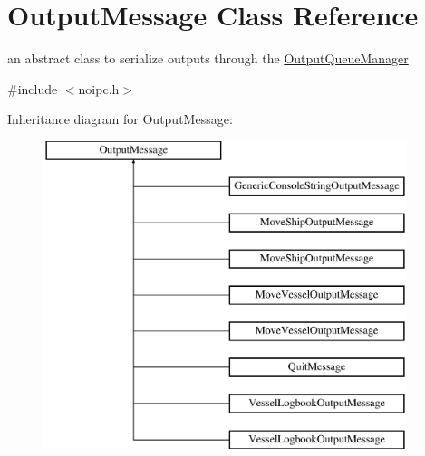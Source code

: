\hypertarget{class_output_message}{}\section{Output\+Message Class Reference}
\label{class_output_message}


an abstract class to serialize outputs through the \mbox{\hyperlink{class_output_queue_manager}{Output\+Queue\+Manager}}  




{\ttfamily \#include $<$noipc.\+h$>$}

Inheritance diagram for Output\+Message\+:\begin{figure}[H]
\begin{center}
\leavevmode
\includegraphics[height=9.000000cm]{d6/d8e/class_output_message}
\end{center}
\end{figure}
